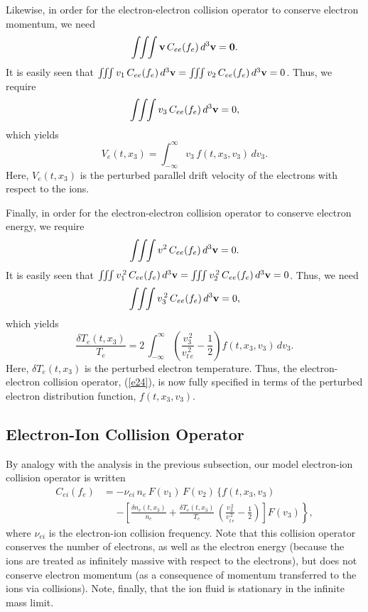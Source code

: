 \documentclass[12pt,prb,aps]{revtex4-1}
\begin{document}
Likewise, in order for the electron-electron collision operator to conserve electron momentum, we need
\begin{equation}\label{e27}
\int\!\!\int\!\!\int {\bf v}\,C_{ee}(f_e)\, d^3{\bf v}= {\bf 0}.
\end{equation}
It is easily seen that 
$\int\!\!\int\!\!\int v_1\,C_{ee}(f_e)\,d^3{\bf v} =\int\!\!\int\!\!\int v_2\,C_{ee}(f_e)\,d^3{\bf v} = 0$.
Thus, we require 
\begin{equation}\label{eyy}
\int\!\!\int\!\!\int v_3\,C_{ee}(f_e)\, d^3{\bf v} = 0,
\end{equation}
which yields
\begin{equation}\label{e29}
 V_e(t,x_3) = \int_{-\infty}^\infty v_3\,f(t,x_3,v_3)\,dv_3.
\end{equation}
Here, $V_e(t,x_3)$ is the perturbed parallel drift velocity of the electrons with respect to the ions.

Finally, in order for the electron-electron collision operator to conserve electron energy, we require
\begin{equation}\label{e20}
\int\!\!\int\!\!\int v^2\,C_{ee}(f_e)\, d^3{\bf v} = 0.
\end{equation}
It is easily seen that 
$\int\!\!\int\!\!\int v_1^{\,2}\,C_{ee}(f_e) \,d^3{\bf v} = \int\!\!\int\!\!\int v_2^{\,2}\,C_{ee}(f_e)\,d^3{\bf v} =0$.
Thus, we need 
\begin{equation}\label{e36s}
\int\!\!\int\!\!\int v_3^{\,2}\,C_{ee}(f_e) \,d^3{\bf v} = 0,
\end{equation}
which yields
\begin{equation}\label{dte}
\frac{\delta T_e(t,x_3)}{T_e} = 2\,\int_{-\infty}^\infty \left(\frac{v_3^{\,2}}{v_{t\,e}^{\,2}}-\frac{1}{2}\right) f(t,x_3,v_3)\,dv_3.
\end{equation}
Here, $\delta T_e(t,x_3)$ is the perturbed electron temperature.
Thus, the electron-electron collision operator, (\ref{e24}), is now fully specified in terms of the perturbed electron distribution function,
$f(t,x_3,v_3)$. 

\subsection{Electron-Ion Collision Operator}
By analogy with the analysis in the previous subsection, our model electron-ion collision operator is written
\begin{align}
C_{ei}(f_e) &=- \nu_{ei}\,n_e\,F(v_1)\,F(v_2)\,\biggr\{ f(t,x_3,v_3) \nonumber\\[0.5ex]&\phantom{=}\left.- \left[\frac{\delta n_e(t,x_3)}{n_e} +\frac{\delta T_e(t,x_3)}{T_e}\,\left(\frac{v_3^{\,2}}{v_{t\,e}^{\,2}}-\frac{1}{2}\right)\right]F(v_3)\right\},
\end{align}
where $\nu_{ei}$ is the electron-ion collision frequency. Note that this collision operator conserves the number of electrons, as well as the electron energy (because the ions are treated as
infinitely massive with respect to the electrons), but does not conserve electron momentum (as a consequence of momentum transferred to the ions via collisions). Note, finally, that the
ion fluid is stationary in the infinite mass limit. 
\end{document}
